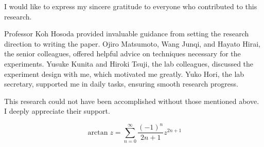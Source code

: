 I would like to express my sincere gratitude to everyone who contributed to this research.

Professor Koh Hosoda provided invaluable guidance from setting the research direction to writing the paper. Ojiro Matsumoto, Wang Junqi, and Hayato Hirai, the senior colleagues, offered helpful advice on techniques necessary for the experiments. Yusuke Kunita and Hiroki Tsuji, the lab colleagues, discussed the experiment design with me, which motivated me greatly. Yuko Hori, the lab secretary, supported me in daily tasks, ensuring smooth research progress.

This research could not have been accomplished without those mentioned above. 
I deeply appreciate their support.








\begin{equation}
    \arctan z = \sum_{n=0}^{\infty} \frac{(-1)^n}{2n+1}z^{2n+1}
\end{equation}

